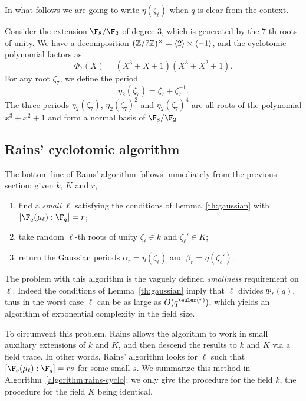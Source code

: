 In what follows we are going to write $\eta(\zeta_\ell)$ when $q$ is
clear from the context.

\begin{example} 
  Consider the extension $\F_8/\F_2$ of degree $3$, which is generated
  by the $7$-th roots of unity. We have a decomposition
  $(\mathbb{Z}/7\mathbb{Z})^\times=\langle 2\rangle\times\langle-1\rangle$, and the
  cyclotomic polynomial factors as
  \begin{equation}
    \Phi_7(X) = (X^3 + X + 1) (X^3 + X^2 + 1).
  \end{equation}
  For any root $\zeta_7$, we define the period
  \begin{equation}
    \eta_2(\zeta_7) = \zeta_7+\zeta_7^{-1}.
  \end{equation}
  The three periods $\eta_2(\zeta_7)$, $\eta_2(\zeta_7)^2$ and
  $\eta_2(\zeta_7)^4$ are all roots of the polynomial $x^3+x^2+1$ and
  form a normal basis of $\F_8/\F_2$.
\end{example}

\subsection{Rains' cyclotomic algorithm}

The bottom-line of Rains' algorithm follows immediately from the
previous section: given $k$, $K$ and $r$,
\begin{enumerate}
\item find a \emph{small} $\ell$ satisfying the conditions of
  Lemma~\ref{th:gaussian} with $[\F_q(\mu_\ell):\F_q]=r$;
\item take random $\ell$-th roots of unity $\zeta_\ell\in k$ and
  $\zeta_\ell'\in K$;
\item return the Gaussian periods $\alpha_r=\eta(\zeta_\ell)$ and
  $\beta_r=\eta(\zeta_\ell')$.
\end{enumerate}

The problem with this algorithm is the vaguely defined
\emph{smallness} requirement on $\ell$. Indeed the conditions of
Lemma~\ref{th:gaussian} imply that $\ell$ divides $\Phi_r(q)$, thus in
the worst case $\ell$ can be as large as $O(q^{\euler(r)})$, which
yields an algorithm of exponential complexity in the field size.

To circumvent this problem, Rains allows the algorithm to work in
small auxiliary extensions of $k$ and $K$, and then descend the
results to $k$ and $K$ via a field trace. In other words, Rains'
algorithm looks for $\ell$ such that $[\F_q(\mu_\ell):\F_q]=rs$ for
some small $s$. We summarize this method in
Algorithm~\ref{algorithm:rains-cyclo}; we only give the procedure for
the field $k$, the procedure for the field $K$ being identical.

